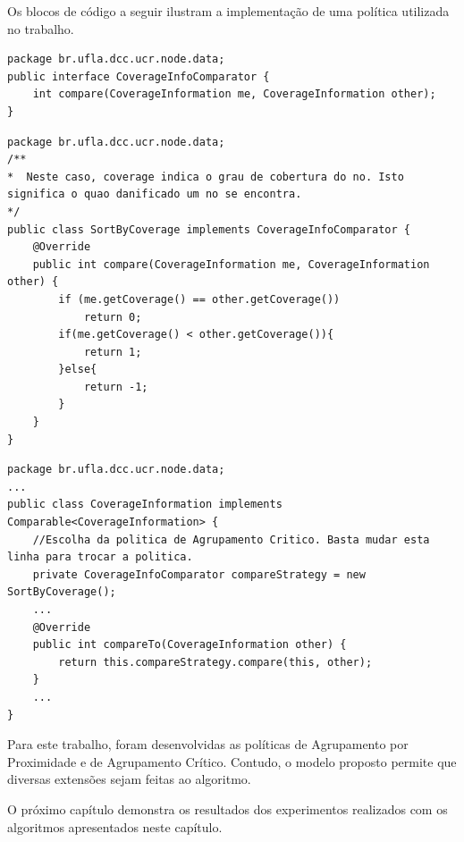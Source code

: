 Os blocos de código a seguir ilustram a implementação de uma política utilizada no trabalho.

\begin{lstlisting}[caption=Procolo (Interface) para implementação de Políticas de Agrupamento.]
package br.ufla.dcc.ucr.node.data;
public interface CoverageInfoComparator {
	int compare(CoverageInformation me, CoverageInformation other);
}
\end{lstlisting}


\begin{lstlisting}[caption=Implementação de Agrupamento Crítico.]
package br.ufla.dcc.ucr.node.data;
/**
*  Neste caso, coverage indica o grau de cobertura do no. Isto significa o quao danificado um no se encontra.
*/
public class SortByCoverage implements CoverageInfoComparator {
	@Override
	public int compare(CoverageInformation me, CoverageInformation other) {
		if (me.getCoverage() == other.getCoverage())
			return 0;
		if(me.getCoverage() < other.getCoverage()){
			return 1;
		}else{
			return -1;
		}
	}
}
\end{lstlisting}


\begin{lstlisting}[caption=Escolha da Política]
package br.ufla.dcc.ucr.node.data;
...
public class CoverageInformation implements Comparable<CoverageInformation> {
	//Escolha da politica de Agrupamento Critico. Basta mudar esta linha para trocar a politica.
	private CoverageInfoComparator compareStrategy = new SortByCoverage();
	...
	@Override
	public int compareTo(CoverageInformation other) {
		return this.compareStrategy.compare(this, other);
	}
	...
}
\end{lstlisting}

Para este trabalho, foram desenvolvidas as políticas de Agrupamento por Proximidade e de Agrupamento Crítico. Contudo, o modelo proposto permite que diversas extensões sejam feitas ao algoritmo.

O próximo capítulo demonstra os resultados dos experimentos realizados com os algoritmos apresentados neste capítulo.
